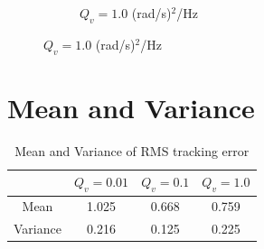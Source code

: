 \documentclass[paper=a4, fontsize=11pt]{scrartcl} %
\numberwithin{equation}{section} %
\numberwithin{figure}{section} %
\numberwithin{table}{section} %
\begin{document}
\begin{figure}[H]
	\begin{subfigure}[b]{0.3\textwidth}
		\noindent{}
	\caption{$Q_v = 1.0$ (rad/s)$^2$/Hz}
	\end{subfigure}
\end{figure} 

\vspace{10mm}

\section*{Mean and Variance}

\vspace{-5mm}
\begin{table}[H]
\caption*{Mean and Variance of RMS tracking error}
\vspace{3mm}
\centering
\begin{tabular}{| c | c | c | c | }
\hline
			& $Q_v = 0.01$ 	& $Q_v = 0.1$ 	& $Q_v = 1.0$ 	\\
\hline 
Mean		& 1.025	  	 	& 0.668 		& 0.759			\\
\hline							
Variance	& 0.216			& 0.125 		& 0.225			\\	
\hline							
\end{tabular}
\end{table}

\pagebreak
\end{document}
